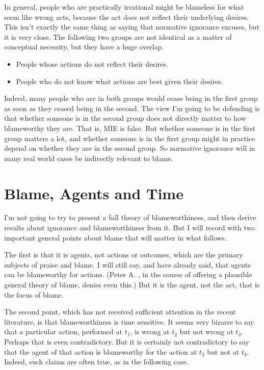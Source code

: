 In general, people who are practically irrational might be blameless for what seem like wrong acts, because the act does not reflect their underlying desires. This isn't exactly the same thing as saying that normative ignorance excuses, but it is very close. The following two groups are not identical as a matter of conceptual necessity, but they have a huge overlap.

\begin{itemize}
\item{} People whose actions do not reflect their desires.

\item{} People who do not know what actions are best given their desires.

\end{itemize}
Indeed, many people who are in both groups would cease being in the first group as soon as they ceased being in the second. The view I'm going to be defending is that whether someone is in the second group does not directly matter to how blameworthy they are. That is, MIE is false. But whether someone is in the first group matters a lot, and whether someone is in the first group might in practice depend on whether they are in the second group. So normative ignorance will in many real world cases be indirectly relevant to blame.

\section{Blame, Agents and Time}
\label{blameagentsandtime}

I'm not going to try to present a full theory of blameworthiness, and then derive results about ignorance and blameworthiness from it. But I will record with two important general points about blame that will matter in what follows.

The first is that it is agents, not actions or outcomes, which are the primary subjects of praise and blame. I will still say, and have already said, that agents can be blameworthy for actions. (Peter A. \citet{Graham2012}, in the course of offering a plausible general theory of blame, denies even this.) But it is the agent, not the act, that is the focus of blame.

The second point, which has not received sufficient attention in the recent literature, is that blameworthiness is time sensitive. It seems very bizarre to say that a particular action, performed at $t_1$, is wrong at $t_2$ but not wrong at $t_3$. Perhaps that is even contradictory. But it is certainly not contradictory to say that the agent of that action is blameworthy for the action at $t_2$ but not at $t_3$. Indeed, such claims are often true, as in the following case.

